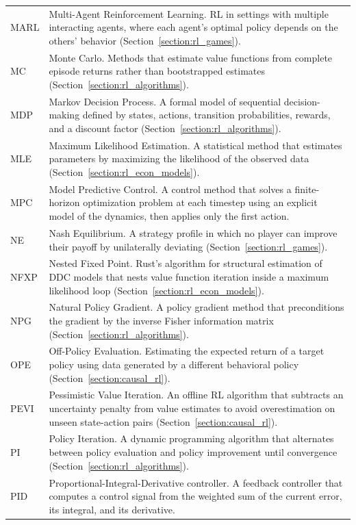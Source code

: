 \begin{longtable}{p{2.2cm} p{12cm}}
MARL & Multi-Agent Reinforcement Learning. RL in settings with multiple interacting agents, where each agent's optimal policy depends on the others' behavior (Section~\ref{section:rl_games}). \\[4pt]
MC & Monte Carlo. Methods that estimate value functions from complete episode returns rather than bootstrapped estimates (Section~\ref{section:rl_algorithms}). \\[4pt]
MDP & Markov Decision Process. A formal model of sequential decision-making defined by states, actions, transition probabilities, rewards, and a discount factor (Section~\ref{section:rl_algorithms}). \\[4pt]
MLE & Maximum Likelihood Estimation. A statistical method that estimates parameters by maximizing the likelihood of the observed data (Section~\ref{section:rl_econ_models}). \\[4pt]
MPC & Model Predictive Control. A control method that solves a finite-horizon optimization problem at each timestep using an explicit model of the dynamics, then applies only the first action. \\[4pt]
NE & Nash Equilibrium. A strategy profile in which no player can improve their payoff by unilaterally deviating (Section~\ref{section:rl_games}). \\[4pt]
NFXP & Nested Fixed Point. Rust's algorithm for structural estimation of DDC models that nests value function iteration inside a maximum likelihood loop (Section~\ref{section:rl_econ_models}). \\[4pt]
NPG & Natural Policy Gradient. A policy gradient method that preconditions the gradient by the inverse Fisher information matrix (Section~\ref{section:rl_algorithms}). \\[4pt]
OPE & Off-Policy Evaluation. Estimating the expected return of a target policy using data generated by a different behavioral policy (Section~\ref{section:causal_rl}). \\[4pt]
PEVI & Pessimistic Value Iteration. An offline RL algorithm that subtracts an uncertainty penalty from value estimates to avoid overestimation on unseen state-action pairs (Section~\ref{section:causal_rl}). \\[4pt]
PI & Policy Iteration. A dynamic programming algorithm that alternates between policy evaluation and policy improvement until convergence (Section~\ref{section:rl_algorithms}). \\[4pt]
PID & Proportional-Integral-Derivative controller. A feedback controller that computes a control signal from the weighted sum of the current error, its integral, and its derivative. \\[4pt]

\end{longtable}
